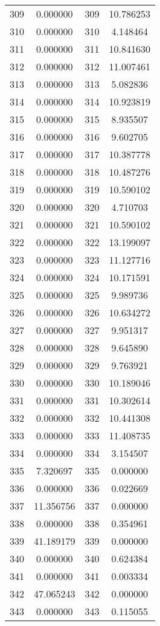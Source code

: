 \documentclass[12pt]{article}
\begin{document}
\begin{longtable}{@{}cccc@{}}
309 & 0.000000 & 309 & 10.786253 \\
310 & 0.000000 & 310 & 4.148464 \\
311 & 0.000000 & 311 & 10.841630 \\
312 & 0.000000 & 312 & 11.007461 \\
313 & 0.000000 & 313 & 5.082836 \\
314 & 0.000000 & 314 & 10.923819 \\
315 & 0.000000 & 315 & 8.935507 \\
316 & 0.000000 & 316 & 9.602705 \\
317 & 0.000000 & 317 & 10.387778 \\
318 & 0.000000 & 318 & 10.487276 \\
319 & 0.000000 & 319 & 10.590102 \\
320 & 0.000000 & 320 & 4.710703 \\
321 & 0.000000 & 321 & 10.590102 \\
322 & 0.000000 & 322 & 13.199097 \\
323 & 0.000000 & 323 & 11.127716 \\
324 & 0.000000 & 324 & 10.171591 \\
325 & 0.000000 & 325 & 9.989736 \\
326 & 0.000000 & 326 & 10.634272 \\
327 & 0.000000 & 327 & 9.951317 \\
328 & 0.000000 & 328 & 9.645890 \\
329 & 0.000000 & 329 & 9.763921 \\
330 & 0.000000 & 330 & 10.189046 \\
331 & 0.000000 & 331 & 10.302614 \\
332 & 0.000000 & 332 & 10.441308 \\
333 & 0.000000 & 333 & 11.408735 \\
334 & 0.000000 & 334 & 3.154507 \\
335 & 7.320697 & 335 & 0.000000 \\
336 & 0.000000 & 336 & 0.022669 \\
337 & 11.356756 & 337 & 0.000000 \\
338 & 0.000000 & 338 & 0.354961 \\
339 & 41.189179 & 339 & 0.000000 \\
340 & 0.000000 & 340 & 0.624384 \\
341 & 0.000000 & 341 & 0.003334 \\
342 & 47.065243 & 342 & 0.000000 \\
343 & 0.000000 & 343 & 0.115055 \\

\end{longtable}
\end{document}
